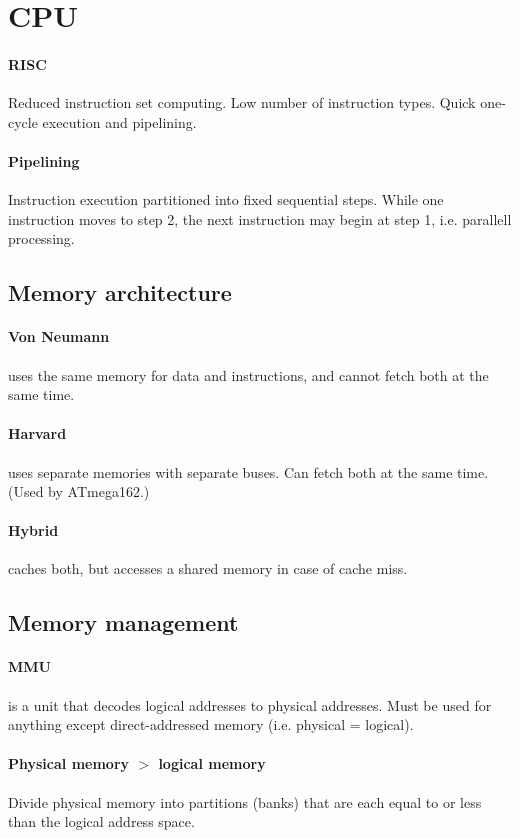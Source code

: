 \documentclass[a4paper, 12pt]{article}
\begin{document}
\section{CPU}
\paragraph{RISC}
Reduced instruction set computing. Low number of instruction types. Quick one-cycle execution and pipelining.

\paragraph{Pipelining} Instruction execution partitioned into fixed sequential steps. While one instruction moves to step 2, the next instruction may begin at step 1, i.e. parallell processing.

\subsection{Memory architecture}
\paragraph{Von Neumann} uses the same memory for data and instructions, and cannot fetch both at the same time.
\paragraph{Harvard} uses separate memories with separate buses. Can fetch both at the same time. (Used by ATmega162.)
\paragraph{Hybrid} caches both, but accesses a shared memory in case of cache miss.

\subsection{Memory management}
\paragraph{MMU} is a unit that decodes logical addresses to physical addresses. Must be used for anything except direct-addressed memory (i.e. physical = logical).
\paragraph{Physical memory $>$ logical memory} Divide physical memory into partitions (banks) that are each equal to or less than the logical address space.
\end{document}
